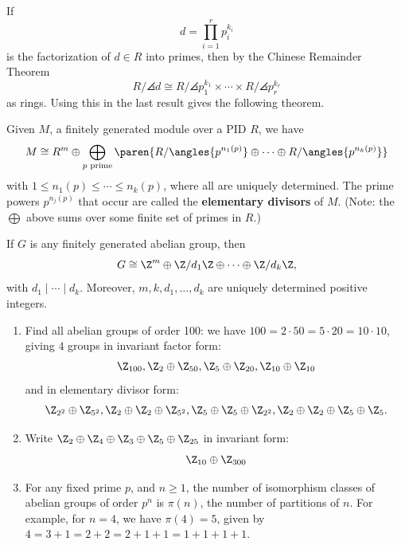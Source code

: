 \begin{rmk}
    If
    $$d = \prod _{i=1}^r p_i^{k_i}$$
    is the factorization of $d \in R$ into primes, then by the Chinese Remainder Theorem
    $$R/\angles{d}\cong R/\angles{p_1^{k_1}}\times \cdots \times R/\angles{p_r^{k_r}}$$
    as rings. Using this in the last result gives the following theorem.
\end{rmk}

\begin{thm}
    Given $M$, a finitely generated module over a PID $R$, we have
    $$M \cong R^m \oplus \bigoplus_{p\text{ prime}} \paren{ R/\angles{p^{n_1(p)}}\oplus \cdots \oplus R/\angles{p^{n_k(p)}}}$$
    with $1 \leq n_1(p) \leq \cdots \leq n_k(p)$, where all are uniquely determined. The prime powers $p^{n_j(p)}$ that occur are called the \textbf{elementary divisors} of $M$. (Note: the $\bigoplus$ above sums over some finite set of primes in $R$.)
\end{thm}

\begin{cor}
    If $G$ is any finitely generated abelian group, then
    $$G \cong \Z^m \oplus \Z/d_1\Z \oplus \cdots \oplus \Z / d_k\Z,$$
    with $d_1 \mid \cdots \mid d_k$. Moreover, $m,k,d_1,\dots,d_k$ are uniquely determined positive integers.
\end{cor}

\begin{ex}
    \begin{enumerate}
        \item Find all abelian groups of order 100: we have $100 = 2 \cdot 50 = 5 \cdot 20 = 10 \cdot 10$, giving $4$ groups in invariant factor form:
        $$\Z_{100}, \Z_2 \oplus \Z_{50}, \Z_5 \oplus \Z_{20},\Z _{10}\oplus \Z_{10}$$
        and in elementary divisor form:
        $$\Z_{2^2}\oplus \Z_{5^2},\Z_2 \oplus \Z_2 \oplus \Z_{5^2},\Z_5 \oplus \Z_5 \oplus \Z_{2^2}, \Z_2 \oplus \Z_2 \oplus \Z_5 \oplus \Z_5.$$
        \item Write $\Z_2 \oplus \Z_4 \oplus \Z_3 \oplus \Z_5 \oplus \Z_{25}$ in invariant form:
        $$\Z_{10}\oplus \Z_{300}$$
        \item For any fixed prime $p$, and $n \geq 1$, the number of isomorphism classes of abelian groups of order $p^n$ is $\pi (n)$, the number of partitions of $n$. For example, for $n=4$, we have $\pi (4)=5$, given by $4=3+1=2+2=2+1+1=1+1+1+1$.
    \end{enumerate}
\end{ex}

